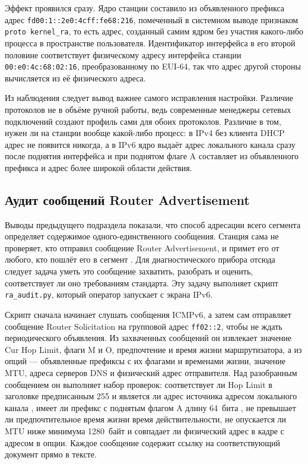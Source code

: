 Эффект проявился сразу. Ядро станции составило из объявленного префикса адрес \texttt{fd00:1::2e0:4cff:fe68:216}, помеченный в системном выводе признаком \texttt{proto kernel\_ra}, то есть адрес, созданный самим ядром без участия какого-либо процесса в пространстве пользователя. Идентификатор интерфейса в его второй половине соответствует физическому адресу интерфейса станции \texttt{00:e0:4c:68:02:16}, преобразованному по EUI-64, так что адрес другой стороны вычисляется из её физического адреса.

Из наблюдения следует вывод важнее самого исправления настройки. Различие протоколов не в объёме ручной работы, ведь современные менеджеры сетевых подключений создают профиль сами для обоих протоколов. Различие в том, нужен ли на станции вообще какой-либо процесс: в IPv4 без клиента DHCP адрес не появится никогда, а в IPv6 ядро выдаёт адрес локального канала сразу после поднятия интерфейса и при поднятом флаге A составляет из объявленного префикса и адрес более широкой области действия.

\subsection{Аудит сообщений Router Advertisement}
\label{sec:audit_ra}

Выводы предыдущего подраздела показали, что способ адресации всего сегмента определяет содержимое одного-единственного сообщения. Станция сама не проверяет, кто отправил сообщение Router Advertisement, и примет его от любого, кто пошлёт его в сегмент \cite{rfc4861}. Для диагностического прибора отсюда следует задача уметь это сообщение захватить, разобрать и оценить, соответствует ли оно требованиям стандарта. Эту задачу выполняет скрипт \texttt{ra\_audit.py}, который оператор запускает с экрана IPv6.

Скрипт сначала начинает слушать сообщения ICMPv6, а затем сам отправляет сообщение Router Solicitation на групповой адрес \texttt{ff02::2}, чтобы не ждать периодического объявления. Из захваченных сообщений он извлекает значение Cur Hop Limit, флаги M и O, предпочтение и время жизни маршрутизатора, а из опций — объявленные префиксы с их флагами и временами жизни, значение MTU, адреса серверов DNS и физический адрес отправителя. Над разобранным сообщением он выполняет набор проверок: соответствует ли Hop Limit в заголовке предписанным 255 и является ли адрес источника адресом локального канала \cite{rfc4861}, имеет ли префикс с поднятым флагом A длину 64~бита \cite{rfc4862}, не превышает ли предпочтительное время жизни время действительности, не опускается ли MTU ниже минимума 1280~байт \cite{rfc8200} и совпадает ли физический адрес в кадре с адресом в опции. Каждое сообщение содержит ссылку на соответствующий документ прямо в тексте.

